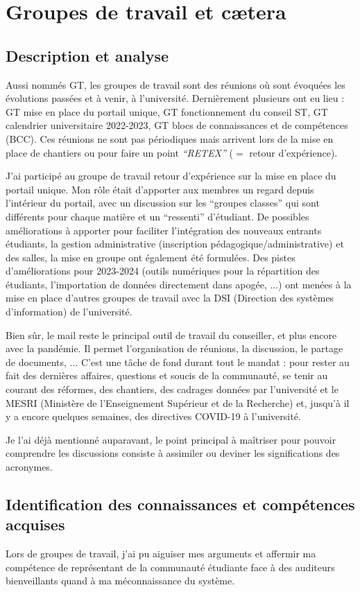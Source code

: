 \documentclass{article}
\begin{document}
\section{Groupes de travail et cætera}

\subsection{Description et analyse}
Aussi nommés GT, les groupes de travail sont des réunions où sont évoquées les évolutions passées et à venir, à l'université. Dernièrement plusieurs ont eu lieu : GT mise en place du portail unique, GT fonctionnement du conseil ST, GT calendrier  universitaire 2022-2023, GT blocs de connaissances et de compétences (BCC). Ces réunions ne sont pas périodiques mais arrivent lors de la mise en place de chantiers ou pour faire un point \textit{``RETEX''} ($=$ retour d'expérience).

J'ai participé au groupe de travail retour d'expérience sur la mise en place du portail unique. Mon rôle était d'apporter aux membres un regard depuis l'intérieur du portail, avec un discussion sur les ``groupes classes'' qui sont différents pour chaque matière et un ``ressenti'' d'étudiant. De possibles améliorations à apporter pour faciliter l'intégration des nouveaux entrants étudiants, la gestion administrative (inscription pédagogique/administrative) et des salles, la mise en groupe ont également été formulées. Des pistes d'améliorations pour 2023-2024 (outils numériques pour la répartition des étudiants, l'importation de données directement dans apogée, ...) ont menées à la mise en place d'autres groupes de travail avec la DSI (Direction des systèmes d’information) de l'université.

Bien sûr, le mail reste le principal outil de travail du conseiller, et plus encore avec la pandémie. Il permet l'organisation de réunions, la discussion, le partage de documents, ... C'est une tâche de fond durant tout le mandat : pour rester au fait des dernières affaires, questions et soucis de la communauté, se tenir au courant des réformes, des chantiers, des cadrages données par l'université et le MESRI (Ministère de l'Enseignement Supérieur et de la Recherche) et, jusqu'à il y a encore quelques semaines, des directives COVID-19 à l'université.

Je l'ai déjà mentionné auparavant, le point principal à maîtriser pour pouvoir comprendre les discussions consiste à assimiler ou deviner les significations des acronymes.
\subsection{Identification des connaissances et compétences acquises}
Lors de groupes de travail, j'ai pu aiguiser mes arguments et affermir ma compétence de représentant de la communauté étudiante face à des auditeurs bienveillants quand à ma méconnaissance du système.\\
\end{document}
